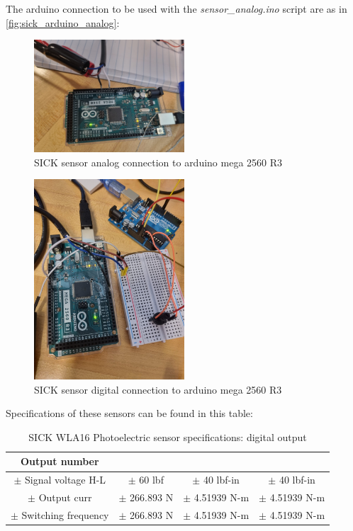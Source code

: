 \documentclass[a4paper]{article}
\begin{document}
The arduino connection to be used with the \textit{sensor\_analog.ino} script are as in \autoref{fig:sick_arduino_analog}:

\begin{figure}
	\centering
	\includegraphics[width=0.5\textwidth,angle=180]{SICK_arduino.jpg}
	\caption{SICK sensor analog connection to arduino mega 2560 R3}
	\label{fig:sick_arduino_analog}
\end{figure}

\begin{figure}[h!]
	\centering
	\includegraphics[width=0.5\textwidth]{arduino_tach.jpeg}
	\caption{SICK sensor digital connection to arduino mega 2560 R3}
	\label{fig:sick_arduino_digital}
\end{figure}

Specifications of these sensors can be found in this table:

\begin{table}[h!]
	\centering
	\caption{SICK WLA16 Photoelectric sensor specifications: digital output\label{tab:SICK16}}
	\begin{tabular}{||c | c | c | c ||} 
		\hline
		Output number &  &  &  \\ [0.5ex] 
		\hline
		$\pm$ Signal voltage H-L & $\pm$ 60 lbf & $\pm$ 40 lbf-in & $\pm$ 40 lbf-in\\ 
		\hline
		$\pm$ Output curr & $\pm$ 266.893 N & $\pm$ 4.51939 N-m & $\pm$ 4.51939 N-m \\
		\hline
		$\pm$ Switching frequency & $\pm$ 266.893 N & $\pm$ 4.51939 N-m & $\pm$ 4.51939 N-m \\
		\hline
	\end{tabular}
\end{table}
\end{document}
